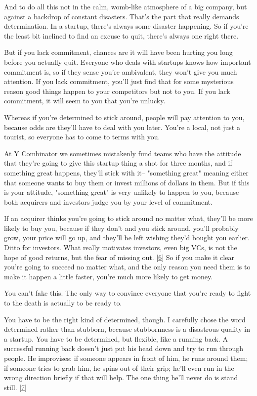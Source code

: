 And to do all this not in the calm, womb-like atmosphere of a big
company, but against a backdrop of constant disasters.  That's the
part that really demands determination.  In a startup, there's
always some disaster happening.  So if you're the least bit inclined
to find an excuse to quit, there's always one right there.

But if you lack commitment, chances are it will have been hurting
you long before you actually quit.  Everyone who deals with startups
knows how important commitment is, so if they sense you're ambivalent,
they won't give you much attention.  If you lack commitment, you'll
just find that for some mysterious reason good things happen to
your competitors but not to you.  If you lack commitment, it will
seem to you that you're unlucky.

Whereas if you're determined to stick around, people will pay
attention to you, because odds are they'll have to deal with you
later.  You're a local, not just a tourist, so everyone has to come
to terms with you.

At Y Combinator we sometimes mistakenly fund teams who have the
attitude that they're going to give this startup thing a shot for
three months, and if something great happens, they'll stick with
it-- "something great" meaning either that someone wants to buy
them or invest millions of dollars in them.  But if this is your
attitude, "something great" is very unlikely to happen to you,
because both acquirers and investors judge you by your level of
commitment.

If an acquirer thinks you're going to stick around no matter what,
they'll be more likely to buy you, because if they don't and you
stick around, you'll probably grow, your price will go up, and
they'll be left wishing they'd bought you earlier.  Ditto for
investors.  What really motivates investors, even big VCs, is not
the hope of good returns, but the fear of missing out. 
[\href{\#f6n}{6}]
So if
you make it clear you're going to succeed no matter what, and the only
reason you need them is to make it happen a little faster, you're
much more likely to get money.

You can't fake this.  The only way to convince everyone that you're
ready to fight to the death is actually to be ready to.

You have to be the right kind of determined, though.  I carefully
chose the word determined rather than stubborn, because stubbornness
is a disastrous quality in a startup.  You have to be determined,
but flexible, like a running back.  A successful running back doesn't
just put his head down and try to run through people.  He improvises:
if someone appears in front of him, he runs around them; if someone
tries to grab him, he spins out of their grip; he'll even run in
the wrong direction briefly if that will help.  The one thing he'll
never do is stand still. 
[\href{\#f7n}{7}]


